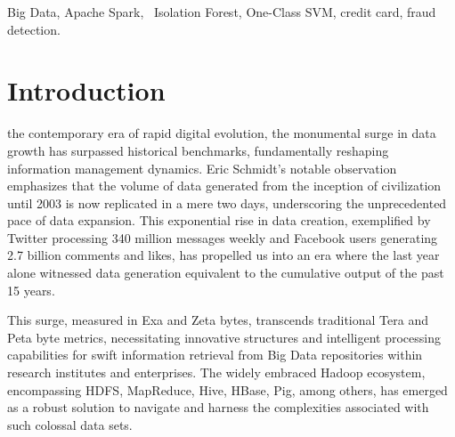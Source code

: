 \documentclass[journal]{IEEEtran}
\begin{document}
\begin{IEEEkeywords}
Big Data, Apache Spark, ~Isolation Forest, One-Class SVM, credit card, fraud detection.
\end{IEEEkeywords}






%
\IEEEpeerreviewmaketitle



\section{Introduction}
% 
% 
% 
% 
 the contemporary era of rapid digital evolution, the monumental surge in data growth has surpassed historical benchmarks, fundamentally reshaping information management dynamics. Eric Schmidt's notable observation emphasizes that the volume of data generated from the inception of civilization until 2003 is now replicated in a mere two days, underscoring the unprecedented pace of data expansion. This exponential rise in data creation, exemplified by Twitter processing 340 million messages weekly and Facebook users generating 2.7 billion comments and likes, has propelled us into an era where the last year alone witnessed data generation equivalent to the cumulative output of the past 15 years.

This surge, measured in Exa and Zeta bytes, transcends traditional Tera and Peta byte metrics, necessitating innovative structures and intelligent processing capabilities for swift information retrieval from Big Data repositories within research institutes and enterprises. The widely embraced Hadoop ecosystem, encompassing HDFS, MapReduce, Hive, HBase, Pig, among others, has emerged as a robust solution to navigate and harness the complexities associated with such colossal data sets.
\end{document}
